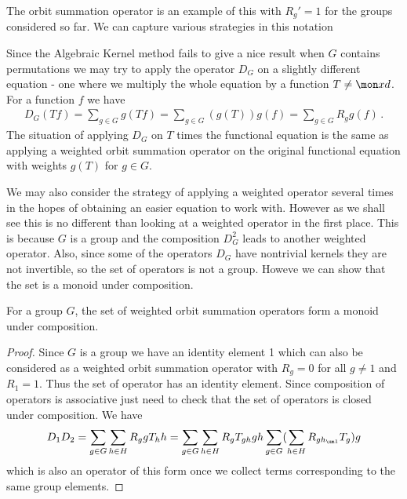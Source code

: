 The orbit summation operator is an example of this with $R_g' = 1$ for the groups considered so far. We can capture various strategies in this notation
\begin{example} Since the Algebraic Kernel method fails to give a nice result when $G$ contains permutations we may try to apply the operator $D_G$ on a slightly different equation - one where we multiply the whole equation by a function $T \neq \mon xd$. For a function $f$ we have
\begin{align}
	D_G(Tf) = \sum_{g\in G}g(T f) = \sum_{g\in G} ( g(T)) g(f) =  \sum_{g\in G} R_g g(f)\,.
\end{align}
The situation of applying $D_G$ on $T$ times the functional equation is the same as applying a weighted orbit summation operator on the original functional equation with weights $g(T)$ for $g \in G$.
\end{example}
We may also consider the strategy of applying a weighted operator several times in the hopes of obtaining an easier equation to work with. However as we shall see this is no different than looking at a weighted operator in the first place. This is because $G$ is a group and the composition $D_G^2$ leads to another weighted operator. Also, since some of the operators $D_G$ have nontrivial kernels they are not invertible, so the set of operators is not a group. Howeve we can show that the set is a monoid under composition.
\begin{prop} For a group $G$, the set of weighted orbit summation operators form a monoid under composition.
\end{prop}
\begin{proof} Since $G$ is a group we have an identity element 1 which can also be considered as a weighted orbit summation operator with $R_g = 0$ for all $g\neq 1$ and $R_1 = 1$. Thus the set of operator has an identity element. Since composition of operators is associative just need to check that the set of operators is closed under composition. We have
\begin{align}
	D_1D_2 = \sum_{g\in G}\sum_{h\in H} R_g gT_h h = \sum_{g\in G}\sum_{h\in H} R_g T_{gh} gh \sum_{g\in G}(\sum_{h\in H} R_{gh_{\um 1}} T_{g}) g
\end{align}
which is also an operator of this form once we collect terms corresponding to the same group elements.
\end{proof}

